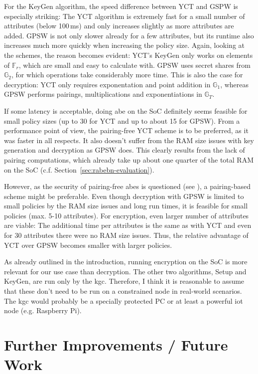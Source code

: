For the KeyGen algorithm, the speed difference between YCT and GSPW is especially striking: 
The YCT algorithm is extremely fast for a small number of attributes (below 100\,ms) and only increases slightly as more attributes are added.
GPSW is not only slower already for a few attributes, but its runtime also increases much more quickly when increasing the policy size.
Again, looking at the schemes, the reason becomes evident: YCT's KeyGen only works on elements of $\mathbb{F}_r$, which are small and easy to calculate with.
GPSW uses secret shares from $\mathbb{G}_2$, for which operations take considerably more time.
This is also the case for decryption: YCT only requires exponentation and point addition in $\mathbb{G}_1$, whereas GPSW performs pairings, multiplications and exponentiations in $\mathbb{G}_T$.

If some latency is acceptable, doing \acrshort{abe} on the SoC definitely seems feasible for small policy sizes (up to 30 for YCT and up to about 15 for GPSW).
From a performance point of view, the pairing-free YCT scheme is to be preferred, as it was faster in all respects.
It also doesn't suffer from the RAM size issues with key generation and decryption as GPSW does.
This clearly results from the lack of pairing computations, which already take up about one quarter of the total RAM on the SoC (c.f. Section~\ref{sec:rabebn-evaluation}).

However, as the security of pairing-free \acrshort{abes} is questioned (see \cite{herranz_attacking_2020}), a pairing-based scheme might be preferable.
Even though decryption with GPSW is limited to small policies by the RAM size issues and long run times, it is feasible for small policies (max. 5-10 attributes).
For encryption, even larger number of attributes are viable: The additional time per attributes is the same as with YCT and even for 30 attributes there were no RAM size issues.
Thus, the relative advantage of YCT over GPSW becomes smaller with larger policies.

As already outlined in the introduction, running encryption on the SoC is more relevant for our use case than decryption. 
The other two algorithms, Setup and KeyGen, are run only by the \acrshort{kgc}.
Therefore, I think it is reasonable to assume that these don't need to be run on a constrained node in real-world scenarios.
The \acrshort{kgc} would probably be a specially protected PC or at least a powerful \acrshort{iot} node (e.g. Raspberry Pi).

\section{Further Improvements / Future Work}

